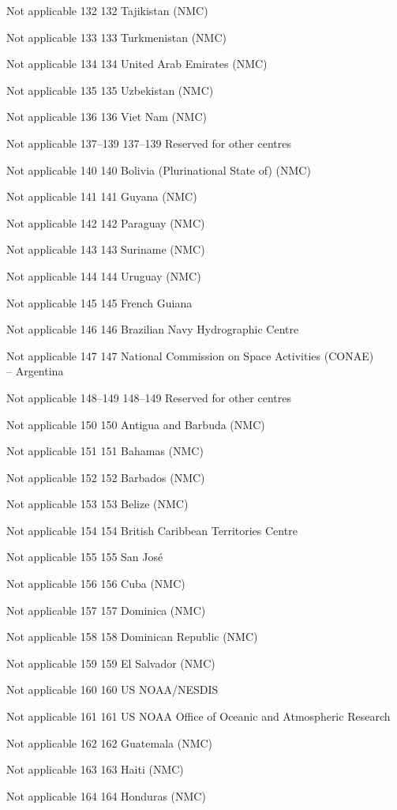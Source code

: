 Not applicable 132 132 Tajikistan (NMC)

Not applicable 133 133 Turkmenistan (NMC)

Not applicable 134 134 United Arab Emirates (NMC)

Not applicable 135 135 Uzbekistan (NMC)

Not applicable 136 136 Viet Nam (NMC)

Not applicable 137--139 137--139 Reserved for other centres

Not applicable 140 140 Bolivia (Plurinational State of) (NMC)

Not applicable 141 141 Guyana (NMC)

Not applicable 142 142 Paraguay (NMC)

Not applicable 143 143 Suriname (NMC)

Not applicable 144 144 Uruguay (NMC)

Not applicable 145 145 French Guiana

Not applicable 146 146 Brazilian Navy Hydrographic Centre

Not applicable 147 147 National Commission on Space Activities (CONAE)\\
-- Argentina

Not applicable 148--149 148--149 Reserved for other centres

Not applicable 150 150 Antigua and Barbuda (NMC)

Not applicable 151 151 Bahamas (NMC)

Not applicable 152 152 Barbados (NMC)

Not applicable 153 153 Belize (NMC)

Not applicable 154 154 British Caribbean Territories Centre

Not applicable 155 155 San José

Not applicable 156 156 Cuba (NMC)

Not applicable 157 157 Dominica (NMC)

Not applicable 158 158 Dominican Republic (NMC)

Not applicable 159 159 El Salvador (NMC)

Not applicable 160 160 US NOAA/NESDIS

Not applicable 161 161 US NOAA Office of Oceanic and Atmospheric Research

Not applicable 162 162 Guatemala (NMC)

Not applicable 163 163 Haiti (NMC)

Not applicable 164 164 Honduras (NMC)

